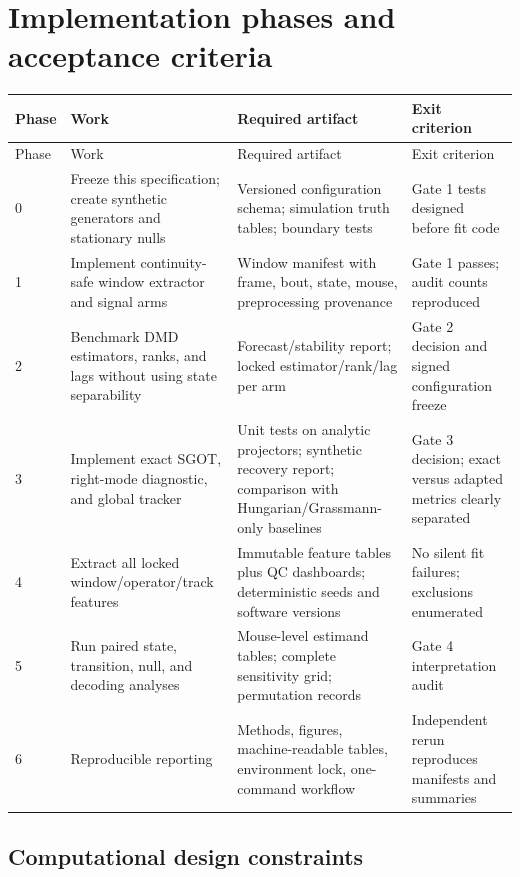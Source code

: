 \documentclass[11pt,a4paper]{article}
\begin{document}
\section{Implementation phases and acceptance criteria}

\begin{longtable}{@{}P{0.10\textwidth}P{0.28\textwidth}P{0.35\textwidth}P{0.19\textwidth}@{}}
\toprule
Phase & Work & Required artifact & Exit criterion\\
\midrule
\endfirsthead
\toprule
Phase & Work & Required artifact & Exit criterion\\
\midrule
{} & Freeze this specification; create synthetic generators and stationary nulls & Versioned configuration schema; simulation truth tables; boundary tests & Gate 1 tests designed before fit code\\
1 & Implement continuity-safe window extractor and signal arms & Window manifest with frame, bout, state, mouse, preprocessing provenance & Gate 1 passes; audit counts reproduced\\
2 & Benchmark DMD estimators, ranks, and lags without using state separability & Forecast/stability report; locked estimator/rank/lag per arm & Gate 2 decision and signed configuration freeze\\
3 & Implement exact SGOT, right-mode diagnostic, and global tracker & Unit tests on analytic projectors; synthetic recovery report; comparison with Hungarian/Grassmann-only baselines & Gate 3 decision; exact versus adapted metrics clearly separated\\
4 & Extract all locked window/operator/track features & Immutable feature tables plus QC dashboards; deterministic seeds and software versions & No silent fit failures; exclusions enumerated\\
5 & Run paired state, transition, null, and decoding analyses & Mouse-level estimand tables; complete sensitivity grid; permutation records & Gate 4 interpretation audit\\
6 & Reproducible reporting & Methods, figures, machine-readable tables, environment lock, one-command workflow & Independent rerun reproduces manifests and summaries\\
\bottomrule
\end{longtable}

\subsection{Computational design constraints}
\end{document}
